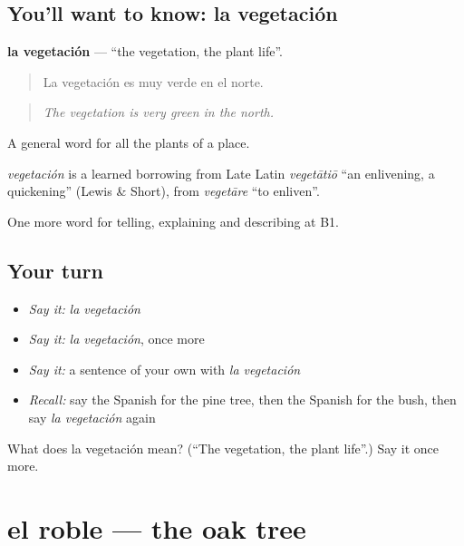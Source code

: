 \subsection*{You'll want to know: la vegetación}
\textbf{la vegetación} — \textquotedblleft{}the vegetation, the plant life\textquotedblright{}.

\begin{quote}
La vegetación es muy verde en el norte.
\end{quote}

\begin{quote}
\emph{The vegetation is very green in the north.}
\end{quote}

A general word for all the plants of a place.

\begin{cousinweb}
\emph{vegetación} is a learned borrowing from Late Latin \emph{vegetātiō} \textquotedblleft{}an enlivening, a quickening\textquotedblright{} (Lewis \& Short), from \emph{vegetāre} \textquotedblleft{}to enliven\textquotedblright{}.
\end{cousinweb}

\begin{grammarlens}[title={What you've built}]
One more word for telling, explaining and describing at B1.
\end{grammarlens}

\subsection*{Your turn}
\begin{itemize}
\raggedright
  \item \emph{Say it:} \emph{la vegetación}
  \item \emph{Say it:} \emph{la vegetación}, once more
  \item \emph{Say it:} a sentence of your own with \emph{la vegetación}
  \item \emph{Recall:} say the Spanish for the pine tree, then the Spanish for the bush, then say \emph{la vegetación} again
\end{itemize}

\begin{tcolorbox}[breakable,colback=teal!4,colframe=teal!35!black,title={Before you move on}]
What does la vegetación mean? (\textquotedblleft{}The vegetation, the plant life\textquotedblright{}.) Say it once more.
\end{tcolorbox}
\section[el roble]{el roble — the oak tree}

